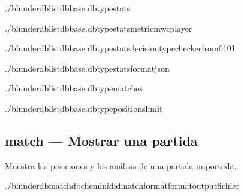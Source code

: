 \documentclass[letterpaper,10pt,spanish]{sphinxmanual}
\begin{document}
\begin{sphinxVerbatim}[commandchars=\\\{\}]
./blunderdblist\PYGZhy{}\PYGZhy{}dbbase.db\PYGZhy{}\PYGZhy{}typestats

./blunderdblist\PYGZhy{}\PYGZhy{}dbbase.db\PYGZhy{}\PYGZhy{}typestats\PYGZhy{}\PYGZhy{}metricmwc\PYGZhy{}\PYGZhy{}player

./blunderdblist\PYGZhy{}\PYGZhy{}dbbase.db\PYGZhy{}\PYGZhy{}typestats\PYGZhy{}\PYGZhy{}decision\PYGZhy{}typechecker\PYGZhy{}\PYGZhy{}from\PYGZhy{}01\PYGZhy{}01

./blunderdblist\PYGZhy{}\PYGZhy{}dbbase.db\PYGZhy{}\PYGZhy{}typestats\PYGZhy{}\PYGZhy{}formatjson

./blunderdblist\PYGZhy{}\PYGZhy{}dbbase.db\PYGZhy{}\PYGZhy{}typematches

./blunderdblist\PYGZhy{}\PYGZhy{}dbbase.db\PYGZhy{}\PYGZhy{}typepositions\PYGZhy{}\PYGZhy{}limit
\end{sphinxVerbatim}


\subsection{match — Mostrar una partida}
\label{\detokenize{cli:match-afficher-un-match}}
\sphinxAtStartPar
Muestra las posiciones y los análisis de una partida importada.

\begin{sphinxVerbatim}[commandchars=\\\{\}]
./blunderdbmatch\PYGZhy{}\PYGZhy{}db\PYGZlt{}chemin\PYGZgt{}\PYGZhy{}\PYGZhy{}id\PYGZlt{}id\PYGZus{}match\PYGZgt{}\PYG{o}{[}\PYGZhy{}\PYGZhy{}format\PYGZlt{}format\PYGZgt{}\PYG{o}{]}\PYG{o}{[}\PYGZhy{}\PYGZhy{}output\PYGZlt{}fichier\PYGZgt{}\PYG{o}{]}
\end{sphinxVerbatim}
\end{document}
